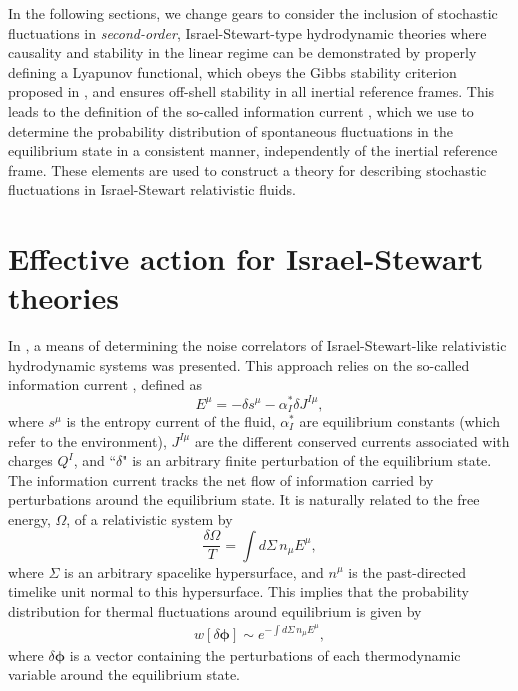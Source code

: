 \documentclass[aps,prd,nofootinbib,amsmath,amssymb,showpacs,longbibliography,singlecolumn,superscriptaddress,notitlepage]{revtex4-1}
\theoremstyle{plain}
\theoremstyle{definition}
\newcommand{\cvec}[1]{\ensuremath{\bm {#1}}}
\begin{document}
 
In the following sections, we change gears to consider the inclusion of stochastic fluctuations in \emph{second-order}, Israel-Stewart-type hydrodynamic theories where causality and stability in the linear regime can be demonstrated by properly defining a Lyapunov functional, which obeys the Gibbs stability criterion proposed in \cite{Gavassino:2021cli}, and ensures off-shell stability in all inertial reference frames. This leads to the definition of the so-called information current \cite{Gavassino:2021kjm}, which we use to determine the probability distribution of spontaneous fluctuations in the equilibrium state in a consistent manner, independently of the inertial reference frame. These elements are used to construct a theory for describing stochastic fluctuations in Israel-Stewart relativistic fluids. 



\section{Effective action for Israel-Stewart theories}
\label{Sec:thermo_stable_fluct}

In \cite{Mullins:2023tjg}, a means of determining the noise correlators of Israel-Stewart-like relativistic hydrodynamic systems was presented. This approach relies on the so-called information current \cite{Gavassino:2021kjm}, defined as 
\begin{equation} \label{InformationCurrent_def}
    E^\mu = -\delta s^\mu - \alpha_I^* \delta J^{I\mu} ,
\end{equation}
where $s^\mu$ is the entropy current of the fluid, $\alpha^*_I$ are equilibrium constants (which refer to the environment), $J^{I\mu}$ are the different conserved currents associated with charges $Q^I$, and ``$\delta$" is an arbitrary finite perturbation of the equilibrium state. The information current tracks the net flow of information carried by perturbations around the equilibrium state. It is naturally related to the free energy, $\Omega$, of a relativistic system by
\begin{equation}
    \frac{\delta \Omega}{T} = \int d\Sigma\, n_{\mu} E^{\mu} ,
\end{equation}
where $\Sigma$ is an arbitrary spacelike hypersurface, and $n^{\mu}$ is the past-directed timelike unit normal to this hypersurface. This implies that the probability distribution for thermal fluctuations around equilibrium is given by 
\begin{eqnarray} \label{thermal_prob_dist}
    w[\delta \cvec{\phi}] \sim e^{- \int d\Sigma\, n_{\mu} E^{\mu}} ,
\end{eqnarray}
where $\delta \cvec{\phi}$ is a vector containing the perturbations of each thermodynamic variable around the equilibrium state.
\end{document}
